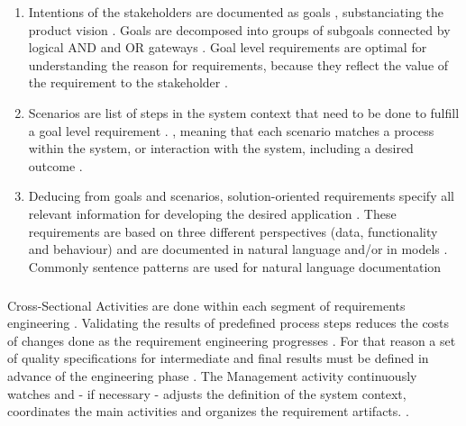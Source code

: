 \begin{enumerate}
    \item Intentions of the stakeholders are documented as goals \parencite[cf.][85]{Pohl.2007}, substanciating the product vision \parencite[cf.][54]{Ebert.2014}. Goals are decomposed into groups of subgoals connected by logical AND and OR gateways \parencite[cf][91]{Pohl.2007}. Goal level requirements are optimal for understanding the reason for requirements, because they reflect the value of the requirement to the stakeholder \parencite[cf.][25]{Lauesen.2008}.
    \item Scenarios are list of steps in the system context that need to be done to fulfill a goal level requirement \parencite[125]{Pohl.2007}.  \parencite[114]{Lauesen.2008}, meaning that each scenario matches a process within the system, or interaction with the system, including a desired outcome \parencite[cf.][114]{Lauesen.2008}.
    \item Deducing from goals and scenarios, solution-oriented requirements specify all relevant information for developing the desired application \parencite[cf.][182-184]{Pohl.2007}. These requirements are based on three different perspectives (data, functionality and behaviour) and are documented in natural language and/or in models \parencite[cf.][184-187]{Pohl.2007}. Commonly sentence patterns are used for natural language documentation      
\end{enumerate}

\subparagraph{} Cross-Sectional Activities are done within each segment of requirements engineering \parencite[cf.][417, 493]{Pohl.2007}. 
Validating the results of predefined process steps reduces the costs of changes done as the requirement engineering progresses \parencite[cf.][419]{Pohl.2007}. For that reason a set of quality specifications for intermediate and final results must be defined in advance of the engineering phase \parencite[cf.][418]{Pohl.2007}.
The Management activity continuously watches and - if necessary - adjusts the definition of the system context, coordinates the main activities and organizes the requirement artifacts. \parencite[cf.][493]{Podjarny.2014}.